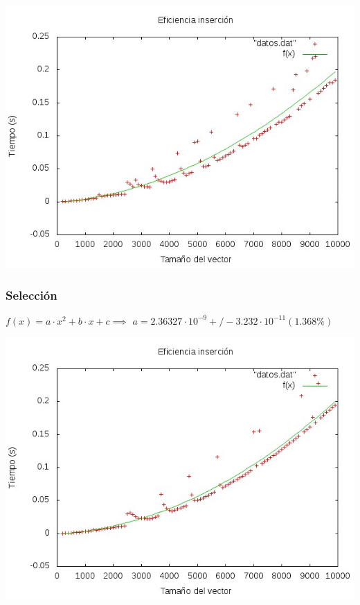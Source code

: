 \documentclass[11pt,spanish]{article} %
\begin{document}
\begin{center}
\includegraphics[scale=0.55]{../Graficas/Insercion/insercionO0_ruben.jpeg}
\end{center}

\newpage
\subsubsection{Selecci\'on}
$f(x) = a\cdot x^2 + b\cdot x + c \implies$
$ a               = 2.36327\cdot 10^{-9}      +/- 3.232\cdot 10^{-11}    (1.368\%) $
\begin{center}
\includegraphics[scale=0.55]{../Graficas/Seleccion/seleccionO0_ruben.jpeg}
\end{center}
\end{document}
